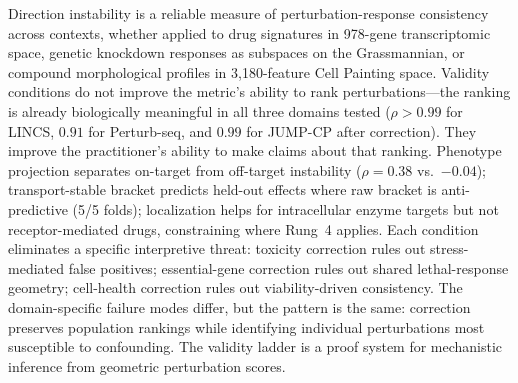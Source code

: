 \documentclass{article}
\begin{document}
Direction instability is a reliable measure of perturbation-response
consistency across contexts, whether applied to drug signatures in 978-gene
transcriptomic space, genetic knockdown responses as subspaces on the
Grassmannian, or compound morphological profiles in 3{,}180-feature Cell
Painting space. Validity conditions do not improve the metric's ability to
rank perturbations---the ranking is already biologically meaningful in all
three domains tested ($\rho > 0.99$ for LINCS, $0.91$ for Perturb-seq,
and $0.99$ for JUMP-CP after correction).
They improve the practitioner's ability to make claims about that ranking.
Phenotype projection separates on-target from off-target instability
($\rho = 0.38$ vs.\ $-0.04$); transport-stable bracket predicts held-out
effects where raw bracket is anti-predictive (5/5 folds); localization
helps for intracellular enzyme targets but not receptor-mediated drugs,
constraining where Rung~4 applies. Each condition eliminates a specific
interpretive threat: toxicity correction rules out stress-mediated false
positives; essential-gene correction rules out shared lethal-response
geometry; cell-health correction rules out viability-driven consistency.
The domain-specific failure modes differ, but the pattern is the same:
correction preserves population rankings while identifying individual
perturbations most susceptible to confounding. The validity ladder is a
proof system for mechanistic inference from geometric perturbation scores.



\end{document}

